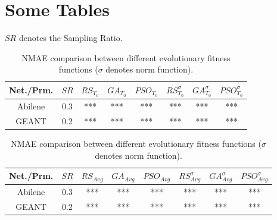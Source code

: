 \section{Some Tables}


$SR$ denotes the Sampling Ratio.

\begin{table}[b]
	\centering
 \footnotesize{
 \renewcommand{\tabcolsep}{0.05cm}
 \renewcommand{\arraystretch}{1.0}
		\begin{tabular}{| c | c | c | c | c | c | c | c |}
		\hline
       Net./Prm. & $SR$ & $RS_{T_{0}}$ & $GA_{T_{0}}$ & $PSO_{T_{0}}$ & $RS^{\sigma}_{T_{0}}$ & $GA^{\sigma}_{T_{0}}$ & $PSO^{\sigma}_{T_{0}}$  \\ \hline
      Abilene    & 0.3 & *** & *** & *** & *** & *** & *** \\ \hline
      GEANT      & 0.2 & *** & *** & *** & *** & *** & *** \\ \hline
    \end{tabular}
    \newline
\vspace*{0.15cm}
\newline
		\begin{tabular}{| c | c | c | c | c | c | c | c |}
		\hline
       Net./Prm. & $SR$ & $RS_{Avg}$ & $GA_{Avg}$ & $PSO_{Avg}$ & $RS^{\sigma}_{Avg}$ & $GA^{\sigma}_{Avg}$ & $PSO^{\sigma}_{Avg}$  \\ \hline
      Abilene    & 0.3 & *** & *** & *** & *** & *** & ***  \\ \hline
      GEANT      & 0.2 & *** & *** & *** & *** & *** & ***  \\ \hline
    \end{tabular}
	\caption{\scriptsize{NMAE comparison between different evolutionary fitness functions ($\sigma$ denotes norm function).}}
	\label{tab:FitFuncCmp1}
}
\end{table}



